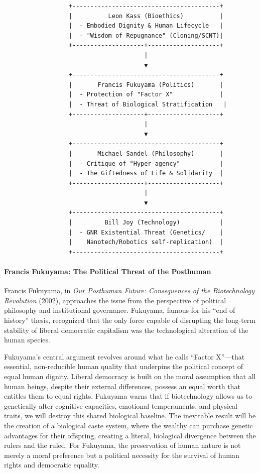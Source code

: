 \begin{verbatim}
                  +-----------------------------------------+
                  |          Leon Kass (Bioethics)          |
                  |  - Embodied Dignity & Human Lifecycle   |
                  |  - "Wisdom of Repugnance" (Cloning/SCNT)|
                  +--------------------+--------------------+
                                       |
                                       ▼
                  +-----------------------------------------+
                  |       Francis Fukuyama (Politics)       |
                  |  - Protection of "Factor X"             |
                  |  - Threat of Biological Stratification   |
                  +--------------------+--------------------+
                                       |
                                       ▼
                  +-----------------------------------------+
                  |       Michael Sandel (Philosophy)       |
                  |  - Critique of "Hyper-agency"           |
                  |  - The Giftedness of Life & Solidarity  |
                  +--------------------+--------------------+
                                       |
                                       ▼
                  +-----------------------------------------+
                  |         Bill Joy (Technology)           |
                  |  - GNR Existential Threat (Genetics/    |
                  |    Nanotech/Robotics self-replication)  |
                  +-----------------------------------------+
\end{verbatim}

\paragraph{Francis Fukuyama: The Political Threat of the
Posthuman}\label{francis-fukuyama-the-political-threat-of-the-posthuman}

Francis Fukuyama, in \emph{Our Posthuman Future: Consequences of the
Biotechnology Revolution} (2002), approaches the issue from the
perspective of political philosophy and institutional governance.
Fukuyama, famous for his ``end of history'' thesis, recognized that the
only force capable of disrupting the long-term stability of liberal
democratic capitalism was the technological alteration of the human
species.

Fukuyama's central argument revolves around what he calls ``Factor
X''---that essential, non-reducible human quality that underpins the
political concept of equal human dignity. Liberal democracy is built on
the moral assumption that all human beings, despite their external
differences, possess an equal worth that entitles them to equal rights.
Fukuyama warns that if biotechnology allows us to genetically alter
cognitive capacities, emotional temperaments, and physical traits, we
will destroy this shared biological baseline. The inevitable result will
be the creation of a biological caste system, where the wealthy can
purchase genetic advantages for their offspring, creating a literal,
biological divergence between the rulers and the ruled. For Fukuyama,
the preservation of human nature is not merely a moral preference but a
political necessity for the survival of human rights and democratic
equality.

